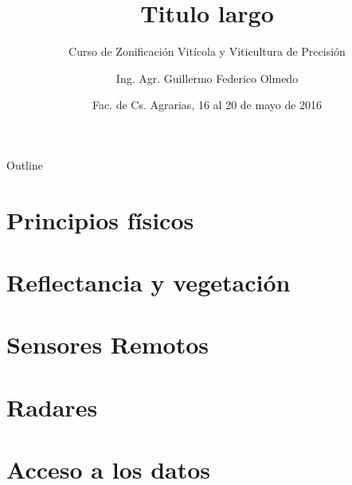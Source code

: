 \documentclass{beamer}
\title[titulo]{Titulo largo}
\subtitle[]{Curso de Zonificación Vitícola y Viticultura de Precisión}
\author[G.F. Olmedo]{Ing. Agr. Guillermo Federico Olmedo}
\institute[INTA] %
{ Laboratorio de Geomática\\
  Recursos Naturales\\
  INTA EEA Mendoza\\
  \vskip10pt
\begin{columns}
	\column{.5\textwidth}
	\begin{flushright}
		\texttt{[image: logoINTA]}
	\end{flushright}
	\column{.5\textwidth}
	\begin{flushleft}
		\texttt{[image: yo]}
	\end{flushleft}
\end{columns}  
}
\date[FCA, 16-20/05/2016]{Fac. de Cs. Agrarias, 16 al 20 de mayo de 2016}
\begin{document}
\begin{frame}[plain]
  \titlepage
\end{frame}

\begin{frame}{Outline}
	\tableofcontents[pausesections]
\end{frame}

\section{Principios físicos}



\section{Reflectancia y vegetación}

\section{Sensores Remotos}

\section{Radares}

\section{Acceso a los datos}
\end{document}
